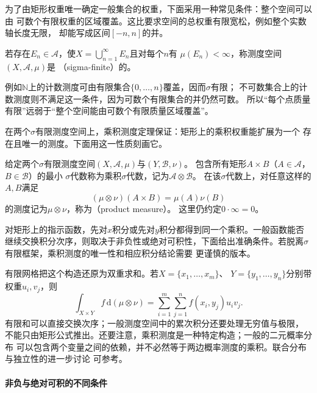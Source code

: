 为了由矩形权重唯一确定一般集合的权重，下面采用一种常见条件：整个空间可以由
可数个有限权重的区域覆盖。这比要求空间的总权重有限宽松，例如整个实数轴长度无限，
却能写成区间$[-n,n]$的并。
\begin{definition}
\label{def:analysis-sigma-finite-measure}
若存在$E_n\in\mathcal{A}$，使$X=\bigcup_{n=1}^{\infty}E_n$且对每个$n$有
$\mu(E_n)<\infty$，称测度空间$(X,\mathcal{A},\mu)$是
（sigma-finite）的。
\end{definition}
例如$\mathbb N$上的计数测度可由有限集合$\{0,\ldots,n\}$覆盖，因而$\sigma$有限；
不可数集合上的计数测度则不满足这一条件，因为可数个有限集合的并仍然可数。
所以“每个点质量有限”远弱于“整个空间能由可数个有限质量区域覆盖”。

在两个$\sigma$有限测度空间上，乘积测度定理保证：矩形上的乘积权重能扩展为一个
存在且唯一的测度。下面用这一性质刻画它。
\begin{definition}
\label{def:analysis-product-measure}
给定两个$\sigma$有限测度空间$(X,\mathcal{A},\mu)$与$(Y,\mathcal{B},\nu)$。
包含所有矩形$A\times B$（$A\in\mathcal{A}$，$B\in\mathcal{B}$）的最小
$\sigma$代数称为乘积$\sigma$代数，记为$\mathcal{A}\otimes\mathcal{B}$。
在该$\sigma$代数上，对任意这样的$A,B$满足
\[   (\mu\otimes\nu)(A\times B)=\mu(A)\nu(B) \]
的测度记为$\mu\otimes\nu$，称为（product measure）。
这里仍约定$0\cdot\infty=0$。
\end{definition}
对矩形上的指示函数，先对$x$积分或先对$y$积分都得到同一个乘积。一般函数能否继续交换积分次序，则取决于非负性或绝对可积性，下面给出准确条件。若脱离$\sigma$有限框架，乘积测度的唯一性和相应积分结论需要
更谨慎的版本。

有限网格把这个构造还原为双重求和。若$X=\{x_1,\ldots,x_m\}$、
$Y=\{y_1,\ldots,y_n\}$分别带权重$u_i,v_j$，则
\[
  \int_{X\times Y}f\,\mathrm{d}(\mu\otimes\nu)
  =
  \sum_{i=1}^m\sum_{j=1}^n f(x_i,y_j)u_iv_j.
\]
有限和可以直接交换次序；一般测度空间中的累次积分还要处理无穷值与极限，
不能只由矩形公式推出。还要注意，乘积测度是一种特定构造；一般的二元概率分布
可以包含两个变量之间的依赖，并不必然等于两边概率测度的乘积。联合分布与独立性的进一步讨论
可参考。

\paragraph{非负与绝对可积的不同条件}

